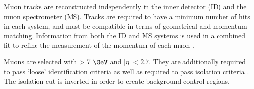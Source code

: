 Muon tracks are reconstructed independently in the inner detector (ID) and the muon spectrometer (MS).
Tracks are required to have a minimum number of hits in each system, and must be compatible in terms
of geometrical and momentum matching. Information from both the ID and MS systems is used in a
combined fit to refine the measurement of the momentum of each muon \cite{PERF-2015-10}. 

Muons are selected with \pT > 7 $\GeV$ and $|\eta| < 2.7$. They are additionally required to pass `loose' identification criteria 
as well as required to pass  isolation criteria \cite{isoWP}. The isolation cut is inverted in order to create background control regions.